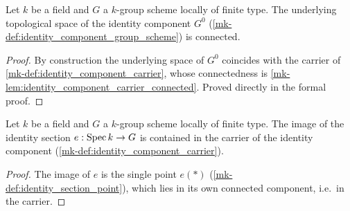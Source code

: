 \begin{lemma}\label{mk-lem:identity_component_connected}
  \leanok

  Let \(k\) be a field and \(G\) a \(k\)-group scheme locally of finite
  type. The underlying topological space of the identity component
  \(G^0\) (\ref{mk-def:identity_component_group_scheme}) is connected.
\end{lemma}
\begin{proof}
  By construction the underlying space of \(G^0\) coincides with the
  carrier of \ref{mk-def:identity_component_carrier}, whose connectedness is
  \ref{mk-lem:identity_component_carrier_connected}. Proved directly in
  the formal proof.
\end{proof}

\begin{lemma}\label{mk-lem:identity_component_section_range_subset}
  \leanok

  Let \(k\) be a field and \(G\) a \(k\)-group scheme locally of finite
  type. The image of the identity section \(e : \operatorname{Spec} k \to G\) is
  contained in the carrier of the identity component
  (\ref{mk-def:identity_component_carrier}).
\end{lemma}
\begin{proof}
  The image of \(e\) is the single point \(e(\ast)\)
  (\ref{mk-def:identity_section_point}), which lies in its own connected
  component, i.e.\ in the carrier.
\end{proof}

